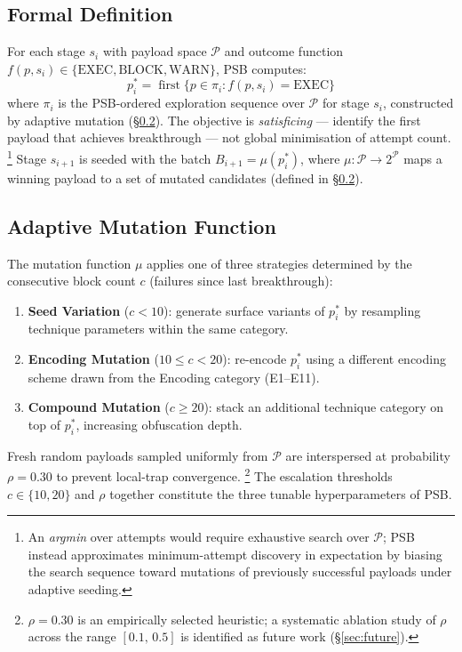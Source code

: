 \documentclass[10pt,twocolumn]{article}
\begin{document}
\subsection{Formal Definition}
For each stage $s_i$ with payload space $\mathcal{P}$ and outcome function
$f(p,s_i)\!\in\!\{\text{EXEC},\text{BLOCK},\text{WARN}\}$, PSB computes:
\begin{equation}
p_i^* = \operatorname{first}\!\bigl\{p \in \pi_i : f(p,s_i)=\text{EXEC}\bigr\}
\end{equation}
where $\pi_i$ is the PSB-ordered exploration sequence over $\mathcal{P}$ for
stage $s_i$, constructed by adaptive mutation (§\ref{sec:psb-strategy}).
The objective is \emph{satisficing} --- identify the first payload that
achieves breakthrough --- not global minimisation of attempt count.%
\footnote{An \textit{argmin} over attempts would require exhaustive search over
$\mathcal{P}$; PSB instead approximates minimum-attempt discovery in
expectation by biasing the search sequence toward mutations of previously
successful payloads under adaptive seeding.}
Stage $s_{i+1}$ is seeded with the batch $B_{i+1}=\mu(p_i^*)$, where
$\mu:\mathcal{P}\!\to\!2^{\mathcal{P}}$ maps a winning payload to a set of
mutated candidates (defined in §\ref{sec:psb-strategy}).

\subsection{Adaptive Mutation Function}
\label{sec:psb-strategy}
The mutation function $\mu$ applies one of three strategies determined by the
consecutive block count $c$ (failures since last breakthrough):
\begin{enumerate}[leftmargin=*,topsep=2pt,itemsep=1pt]
  \item \textbf{Seed Variation} ($c<10$): generate surface variants of $p_i^*$
        by resampling technique parameters within the same category.
  \item \textbf{Encoding Mutation} ($10\leq c<20$): re-encode $p_i^*$ using
        a different encoding scheme drawn from the Encoding category (E1--E11).
  \item \textbf{Compound Mutation} ($c\geq 20$): stack an additional technique
        category on top of $p_i^*$, increasing obfuscation depth.
\end{enumerate}
Fresh random payloads sampled uniformly from $\mathcal{P}$ are interspersed
at probability $\rho{=}0.30$ to prevent local-trap convergence.%
\footnote{$\rho{=}0.30$ is an empirically selected heuristic; a systematic
ablation study of $\rho$ across the range $[0.1,\,0.5]$ is identified as
future work (§\ref{sec:future}).}
The escalation thresholds $c\!\in\!\{10,20\}$ and $\rho$ together constitute
the three tunable hyperparameters of PSB.
\end{document}
